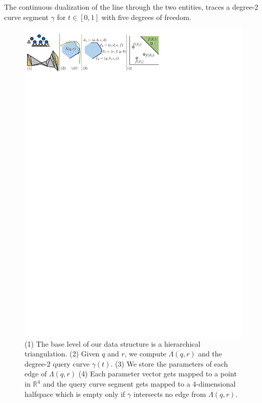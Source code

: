\documentclass[a4paper, UKenglish]{lipics-v2018}
\begin{document}
\begin{lemma}
\label{lemma:hyperbola}
  The continuous dualization of the line through the two entities, traces a degree-2 curve segment $\gamma$ for $t \in [0,1]$ with five degrees of freedom.
\end{lemma}


\begin{figure}[h]
    \centering
    \includegraphics[]{../panel}
    \caption{(1) The base level of our data structure is a hierarchical triangulation. (2) Given $q$ and $r$, we compute $\Lambda(q,r)$ and the degree-2 query curve $\gamma(t)$. (3) We store the parameters of each edge of $\Lambda(q,r)$ (4) Each parameter vector gets mapped to a point in $\mathbb{R}^4$ and the query curve segment gets mapped to a 4-dimensional halfspace which is empty only if $\gamma$ intersects no edge from $\Lambda(q,r)$.}
    \label{fig:panel}
\end{figure}
\end{document}
